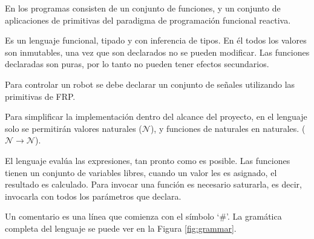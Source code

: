   En \frob{} los programas consisten de un conjunto de funciones, y un
conjunto de aplicaciones de primitivas del paradigma de programación
funcional reactiva.
 
 
  Es un lenguaje funcional, tipado y con inferencia de tipos.
  En él todos los valores son inmutables, una vez que son declarados
no se pueden modificar.
  Las funciones declaradas son puras, por lo tanto no pueden tener efectos
secundarios.

  Para controlar un robot se debe declarar un conjunto de señales utilizando
las primitivas de FRP.

  Para simplificar la implementación dentro del alcance del proyecto,
en el lenguaje solo se permitirán valores
naturales ($\mathcal{N}$), y funciones de naturales en naturales.
($\mathcal{N} \rightarrow \mathcal{N}$).

  El lenguaje evalúa las expresiones, tan pronto como es posible. Las
funciones tienen un conjunto de variables libres, cuando un valor les es
asignado, el resultado es calculado.
  Para invocar una función es necesario saturarla, es decir, invocarla con
todos los parámetros que declara.
  


  Un comentario es una línea que comienza con el símbolo `\#'.
  La gramática completa del lenguaje se puede ver en la
Figura \ref{fig:grammar}.
